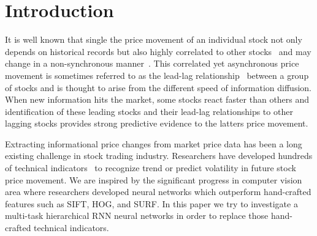 
\chapter{Introduction}
\label{cha:intro}



It is well known that single the price movement of an individual
stock not only depends on historical records but also highly
correlated to other
stocks~\cite{lo1990contrarian,mech1993portfolio} and may change
in a non-synchronous
manner~\cite{lo1990contrarian,brennan1993investment}. This
correlated yet asynchronous price movement is sometimes referred
to as the lead-lag relationship~\cite{hou2007industry} between a
group of stocks and is thought to arise from the different speed
of information
diffusion\cite{lo1990contrarian,badrinath1995shepherds,mcqueen1996delayed}.
When new information hits the market, some stocks react faster
than others and identification of these leading stocks and their
lead-lag relationships to other lagging stocks provides strong
predictive evidence to the latter\textquotesingle s price
movement.


Extracting informational price changes from market price data has
been a long existing challenge in stock trading industry.
Researchers have developed hundreds of technical
indicators~\cite{kirkpatrick2010technical} to recognize trend or
predict volatility in future stock price movement. We are
inspired by the significant progress in computer vision area
where researchers developed neural networks which outperform
hand-crafted features such as SIFT, HOG, and SURF. In this paper
we try to investigate a multi-task hierarchical RNN neural
networks in order to replace those hand-crafted technical
indicators.



